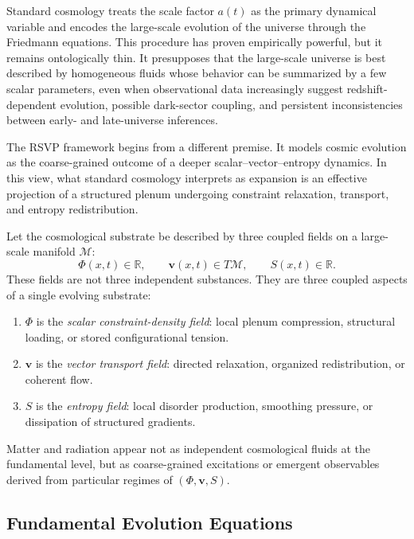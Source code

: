 \documentclass[12pt,a4paper]{article}
\theoremstyle{remark}
\newcommand{\vv}{\mathbf{v}}
\begin{document}
Standard cosmology treats the scale factor $a(t)$ as the primary dynamical variable and encodes the large-scale evolution of the universe through the Friedmann equations. This procedure has proven empirically powerful, but it remains ontologically thin. It presupposes that the large-scale universe is best described by homogeneous fluids whose behavior can be summarized by a few scalar parameters, even when observational data increasingly suggest redshift-dependent evolution, possible dark-sector coupling, and persistent inconsistencies between early- and late-universe inferences.

The RSVP framework begins from a different premise. It models cosmic evolution as the coarse-grained outcome of a deeper scalar--vector--entropy dynamics. In this view, what standard cosmology interprets as expansion is an effective projection of a structured plenum undergoing constraint relaxation, transport, and entropy redistribution.

Let the cosmological substrate be described by three coupled fields on a large-scale manifold $\mathcal{M}$:
\begin{equation}
\Phi(x,t) \in \mathbb{R}, \qquad \vv(x,t) \in T\mathcal{M}, \qquad S(x,t) \in \mathbb{R}.
\end{equation}
These fields are not three independent substances. They are three coupled aspects of a single evolving substrate:
\begin{enumerate}[leftmargin=2em]
\item $\Phi$ is the \emph{scalar constraint-density field}: local plenum compression, structural loading, or stored configurational tension.
\item $\vv$ is the \emph{vector transport field}: directed relaxation, organized redistribution, or coherent flow.
\item $S$ is the \emph{entropy field}: local disorder production, smoothing pressure, or dissipation of structured gradients.
\end{enumerate}
Matter and radiation appear not as independent cosmological fluids at the fundamental level, but as coarse-grained excitations or emergent observables derived from particular regimes of $(\Phi, \vv, S)$.

\subsection{Fundamental Evolution Equations}
\end{document}
